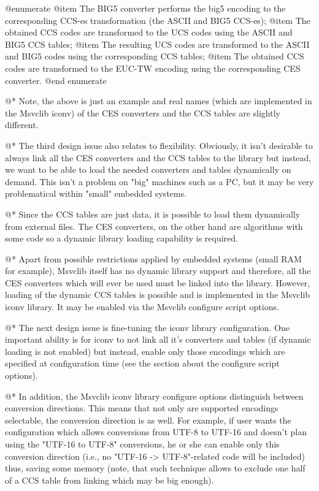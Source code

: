 @enumerate
@item
The BIG5 converter performs the big5 encoding to the corresponding CCS-es transformation
(the ASCII and BIG5 CCS-es);
@item
The obtained CCS codes are transformed to the UCS codes using the ASCII and BIG5 CCS tables;
@item
The resulting UCS codes are transformed to the ASCII and BIG5 codes using
the corresponding CCS tables;
@item
The obtained CCS codes are transformed to the EUC-TW encoding using the corresponding
CES converter.
@end enumerate

@*
Note, the above is just an example and real names (which are implemented
in the Msvclib iconv) of the CES converters and the CCS tables are slightly different.

@*
The third design issue also relates to flexibility. Obviously, it isn't
desirable to always link all the CES converters and the CCS tables to the library
but instead, we want to be able to load the needed converters and tables
dynamically on demand. This isn't a problem on "big" machines such as
a PC, but it may be very problematical within "small" embedded systems.

@*
Since the CCS tables are just data, it is possible to load them
dynamically from external files.  The CES converters, on the other hand
are algorithms with some code so a dynamic library loading 
capability is required.

@*
Apart from possible restrictions applied by embedded systems (small
RAM for example), Msvclib itself has no dynamic library support and
therefore, all the CES converters which will ever be used must be linked into
the library.   However, loading of the dynamic CCS tables is possible and is
implemented in the Msvclib iconv library.  It may be enabled via the Msvclib
configure script options.

@*
The next design issue is fine-tuning the iconv library
configuration.  One important ability is for iconv to not link all it's
converters and tables (if dynamic loading is not enabled) but instead,
enable only those encodings which are specified at configuration
time (see the section about the configure script options).

@*
In addition, the Msvclib iconv library configure options distinguish between
conversion directions. This means that not only are supported encodings
selectable, the conversion direction is as well. For example, if user wants
the configuration which allows conversions from UTF-8 to UTF-16 and
doesn't plan using the "UTF-16 to UTF-8" conversions, he or she can 
enable only
this conversion direction (i.e., no "UTF-16 -> UTF-8"-related code will
be included) thus, saving some memory (note, that such technique allows to
exclude one half of a CCS table from linking which may be big enough).

